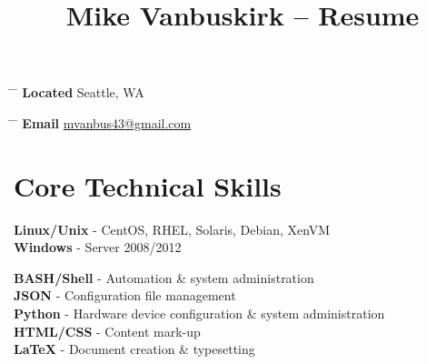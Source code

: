 \documentclass[10pt]{article} %
\begin{document}

\title{Mike Vanbuskirk -- Resume} %


\parbox{0.5\textwidth}{ %
\begin{tabbing} %
\hspace{3cm} \= \hspace{4cm} \= \kill %
{\bf Located} \> Seattle, WA\\ %
\end{tabbing}}
\hfill %
\parbox{0.5\textwidth}{ %
\begin{tabbing} %
\hspace{3cm} \= \hspace{4cm} \= \kill %
{\bf Email} \> \href{mailto:mvanbus43@gmail.com}{mvanbus43@gmail.com} \\ %
\end{tabbing}}


\section{Core Technical Skills}

{
\textbf{Linux/Unix} - CentOS, RHEL, Solaris, Debian, XenVM\\
\textbf{Windows} - Server 2008/2012
}


{
\textbf{BASH/Shell} - Automation \& system administration\\
\textbf{JSON} - Configuration file management\\
\textbf{Python} - Hardware device configuration \& system administration\\
\textbf{HTML/CSS} - Content mark-up\\
\textbf{LaTeX} - Document creation \& typesetting
}
\end{document}
